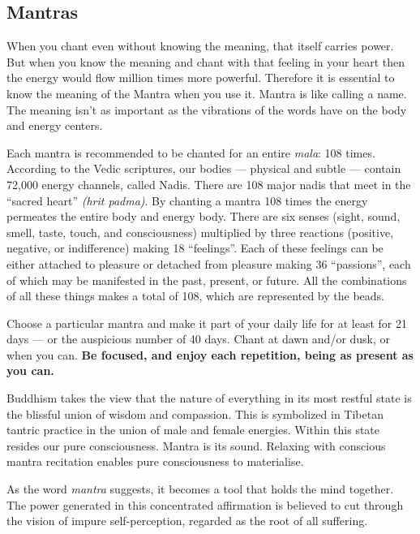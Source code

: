 %

  \subsection*{Mantras}
  
  When you chant even without knowing the meaning, that itself carries power. But when you know 
  the meaning and chant with that feeling in your heart then the energy would flow million times 
  more powerful. Therefore it is essential to know the meaning of the Mantra when you use it. 
  Mantra is like calling a name. The meaning isn't as important as the vibrations of the words 
  have on the body and energy centers.

  Each mantra is recommended to be chanted for an entire \emph{mala}: 108 times. According to the Vedic 
  scriptures, our bodies ---  physical and subtle --- contain 72,000 energy channels, called Nadis.
  There are 108 major nadis that meet in the ``sacred heart'' \emph{(hrit padma)}. By chanting a mantra 
  108 times the energy permeates the entire body and energy body.  There are six senses (sight, 
  sound, smell, taste, touch, and consciousness) multiplied by three reactions (positive, 
  negative, or indifference) making 18 ``feelings''. Each of these feelings can be either attached 
  to pleasure or detached from pleasure making 36 ``passions'', each of which may be manifested in 
  the past, present, or future. All the combinations of all these things makes a total of 108, 
  which are represented by the beads.

  Choose a particular mantra and make it part of your daily life for at least for 21 days --- or 
  the auspicious number of 40 days. Chant at dawn and/or dusk, or when you can. 
  \textbf{Be focused, and enjoy each repetition, being as present as you can.}

  Buddhism takes the view that the nature of everything in its most restful state is the blissful 
  union of wisdom and compassion. This is symbolized in Tibetan tantric practice in the union of 
  male and female energies. Within this state resides our pure consciousness. Mantra is its sound. 
  Relaxing with conscious mantra recitation enables pure consciousness to materialise. 

  As the word \emph{mantra} suggests, it becomes a tool that holds the mind together. The power 
  generated in this concentrated affirmation is believed to cut through the vision of impure 
  self-perception, regarded as the root of all suffering.

